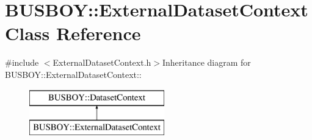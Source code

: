 \hypertarget{classBUSBOY_1_1ExternalDatasetContext}{
\section{BUSBOY::ExternalDatasetContext Class Reference}
\label{classBUSBOY_1_1ExternalDatasetContext}
}


{\ttfamily \#include $<$ExternalDatasetContext.h$>$}Inheritance diagram for BUSBOY::ExternalDatasetContext::\begin{figure}[H]
\begin{center}
\leavevmode
\includegraphics[height=2cm]{classBUSBOY_1_1ExternalDatasetContext}
\end{center}
\end{figure}
